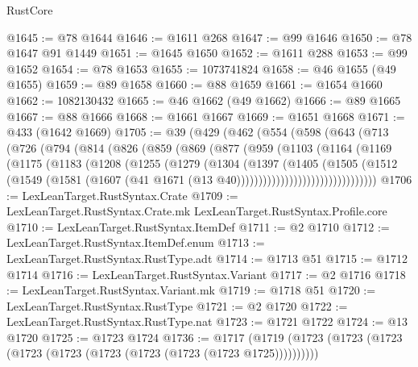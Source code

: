 \begin{lexlean}{RustCore}
\begin{coremodule}
@1645 := @78 @1644
@1646 := @1611 @268
@1647 := @99 @1646
@1650 := @78 @1647 @91 @1449
@1651 := @1645 @1650
@1652 := @1611 @288
@1653 := @99 @1652
@1654 := @78 @1653
@1655 := 1073741824
@1658 := @46 @1655 (@49 @1655)
@1659 := @89 @1658
@1660 := @88 @1659
@1661 := @1654 @1660
@1662 := 1082130432
@1665 := @46 @1662 (@49 @1662)
@1666 := @89 @1665
@1667 := @88 @1666
@1668 := @1661 @1667
@1669 := @1651 @1668
@1671 := @433 (@1642 @1669)
@1705 := @39
    (@429
      (@462
        (@554
          (@598
            (@643
              (@713
                (@726
                  (@794
                    (@814
                      (@826
                        (@859
                          (@869
                            (@877
                              (@959
                                (@1103
                                  (@1164
                                    (@1169
                                      (@1175
                                        (@1183
                                          (@1208
                                            (@1255
                                              (@1279
                                                (@1304
                                                  (@1397
                                                    (@1405
                                                      (@1505
                                                        (@1512
                                                          (@1549
                                                            (@1581
                                                              (@1607
                                                                (@41
                                                                  @1671
                                                                  (@13
                                                                    @40))))))))))))))))))))))))))))))))
@1706 := LexLeanTarget.RustSyntax.Crate
@1709 := LexLeanTarget.RustSyntax.Crate.mk LexLeanTarget.RustSyntax.Profile.core
@1710 := LexLeanTarget.RustSyntax.ItemDef
@1711 := @2 @1710
@1712 := LexLeanTarget.RustSyntax.ItemDef.enum
@1713 := LexLeanTarget.RustSyntax.RustType.adt
@1714 := @1713 @51
@1715 := @1712 @1714
@1716 := LexLeanTarget.RustSyntax.Variant
@1717 := @2 @1716
@1718 := LexLeanTarget.RustSyntax.Variant.mk
@1719 := @1718 @51
@1720 := LexLeanTarget.RustSyntax.RustType
@1721 := @2 @1720
@1722 := LexLeanTarget.RustSyntax.RustType.nat
@1723 := @1721 @1722
@1724 := @13 @1720
@1725 := @1723 @1724
@1736 := @1717 (@1719 (@1723 (@1723 (@1723 (@1723 (@1723 (@1723 (@1723 (@1723 (@1723 @1725))))))))))

\end{coremodule}
\end{lexlean}
